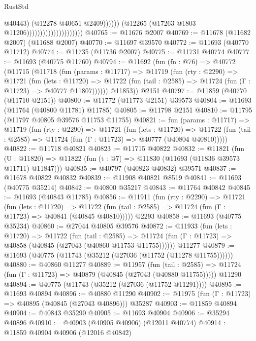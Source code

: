 \begin{lexlean}{RustStd}
\begin{coremodule}
                                                      @40443)
                                                    (@12278 @40651 @2409))))))
                                          (@12265 (@17263 @1803 @11206)))))))))))))))))))))
@40765 := @11676 @2007
@40769 := @11678 (@11682 @2007) (@11688 @2007)
@40770 := @11697 @39570
@40772 := @11693 (@40770 @11712)
@40774 := @11735 (@11736 @2007)
@40775 := @11731 @40774
@40777 := @11693 (@40775 @11760)
@40794 := @11692
    (fun (fn : @76) =>
    @40772
      (@11715
        (@11718
          (fun (params : @11717) =>
          @11719
            (fun (rty : @2290) =>
            @11721
              (fun (lets : @11720) =>
              @11722 (fun (tail : @2585) => @11724 (fun (Γ : @11723) => @40777 @11807))))))
        @11853))
    @2151
@40797 := @11859 (@40770 (@11710 @2151))
@40800 := @11772 (@11773 @2151) @39573
@40804 := @11693 (@11764 (@40800 @11781) @11785)
@40805 := @11798 @2151
@40810 := @11795 (@11797 @40805 @39576 @11753 @11755)
@40821 := fun (params : @11717) =>
  @11719
    (fun (rty : @2290) =>
    @11721
      (fun (lets : @11720) =>
      @11722 (fun (tail : @2585) => @11724 (fun (Γ : @11723) => @40777 (@40804 @40810)))))
@40822 := @11718 @40821
@40823 := @11715 @40822
@40832 := @11821
    (fun (U : @11820) => @11822 (fun (t : @7) => @11830 (@11693 (@11836 @39573 @11711) @11847)))
@40835 := @40797 (@40823 @40832) @39571
@40837 := @11678 @40822 @40832
@40839 := @11908 @40821 @8519
@40841 := @11693 (@40775 @35214)
@40842 := @40800 @35217
@40843 := @11764 @40842
@40845 := @11693 (@40843 @11785)
@40856 := @11911
    (fun (rty : @2290) =>
    @11721
      (fun (lets : @11720) =>
      @11722 (fun (tail : @2585) => @11724 (fun (Γ : @11723) => @40841 (@40845 @40810)))))
    @2293
@40858 := @11693 (@40775 @35234)
@40860 := @27044 @40805 @39576
@40872 := @11933
    (fun (lets : @11720) =>
    @11722
      (fun (tail : @2585) =>
      @11724 (fun (Γ : @11723) => @40858 (@40845 (@27043 (@40860 @11753 @11755))))))
    @11277
@40879 := @11693 (@40775 (@11743 (@35212 (@27036 (@11752 (@11278 @11755))))))
@40880 := @40860 @11277
@40889 := @11957
    (fun (tail : @2585) => @11724 (fun (Γ : @11723) => @40879 (@40845 (@27043 (@40880 @11755)))))
    @11290
@40894 := @40775 (@11743 (@35212 (@27036 (@11752 @11291))))
@40895 := @11693 @40894
@40896 := @40880 @11290
@40902 := @11975 (fun (Γ : @11723) => @40895 (@40845 (@27043 @40896))) @35287
@40903 := @11859 @40894
@40904 := @40843 @35290
@40905 := @11693 @40904
@40906 := @35294 @40896
@40910 := @40903 (@40905 @40906) (@12011 @40774)
@40914 := @11859 @40904 @40906 (@12016 @40842)

\end{coremodule}
\end{lexlean}
